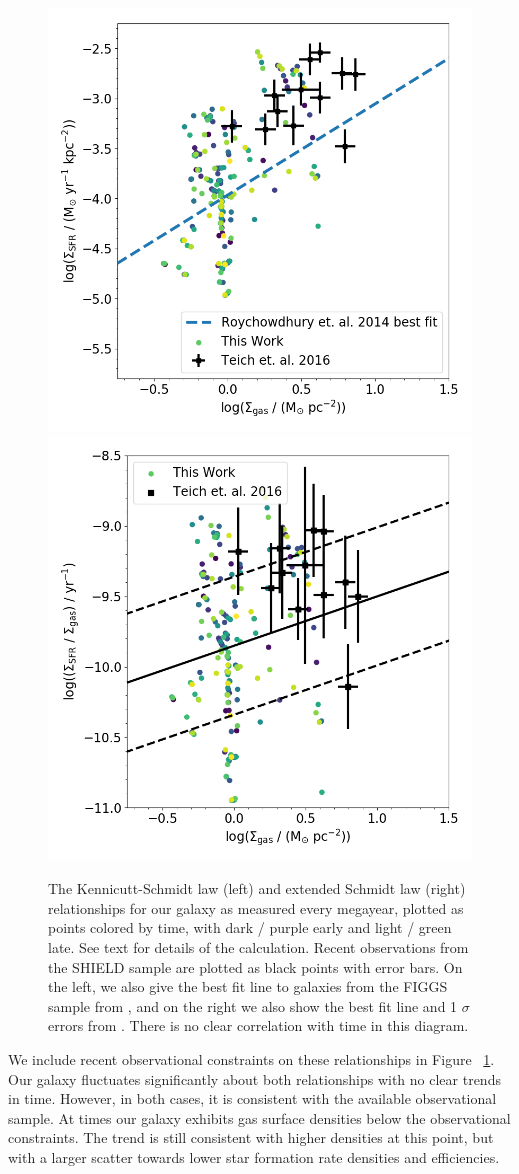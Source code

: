 \documentclass[fleqn,usenatbib,useAMS]{mnras}
\begin{document}
\begin{figure}
\centering
\includegraphics[width=0.475\linewidth]{all_gas_schmidt_law_evolution.png}
\includegraphics[width=0.475\linewidth]{all_gas_efficiency_evolution.png}
\caption{The Kennicutt-Schmidt law (left) and extended Schmidt law (right) relationships for our galaxy as measured every megayear, plotted as points colored by time, with dark / purple early and light / green late. See text for details of the calculation. Recent observations from the SHIELD sample \protect\citep{Teich2016} are plotted as black points with error bars. On the left, we also give the best fit line to galaxies from the FIGGS sample from \protect\cite{Roychowdhury2014}, and on the right we also show the best fit line and 1 $\sigma$ errors from \protect\cite{Shi2011}. There is no clear correlation with time in this diagram.} %
\label{fig:KS}
\end{figure}

We include recent observational constraints on these relationships in Figure ~\ref{fig:KS}. Our galaxy fluctuates significantly about both relationships with no clear trends in time. However, in both cases, it is consistent with the available observational sample. At times our galaxy exhibits gas surface densities below the observational constraints. The trend is still consistent with higher densities at this point, but with a larger scatter towards lower star formation rate densities and efficiencies.
\end{document}

